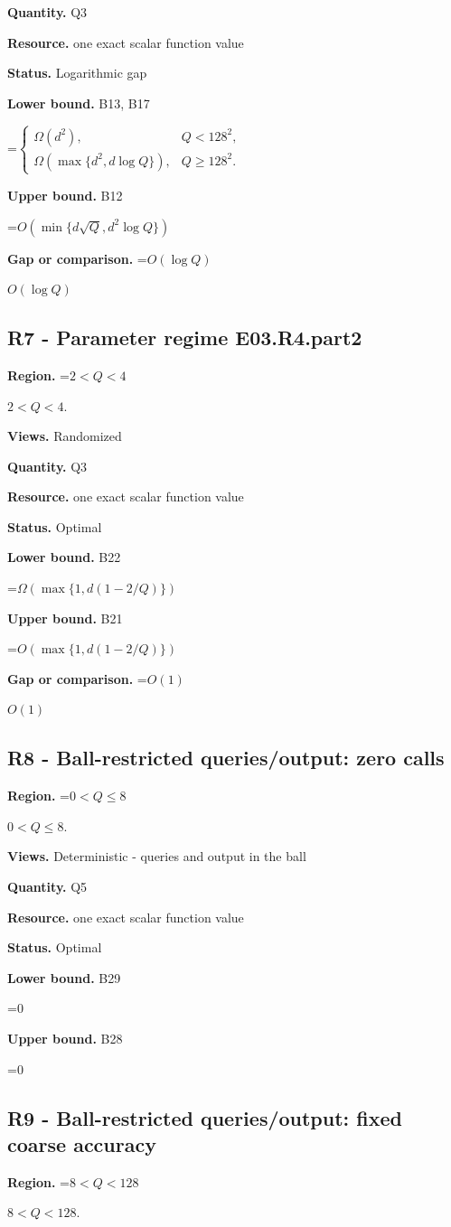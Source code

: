 \documentclass[10pt,a4paper]{article}
\newcommand{\AtlasMath}[1]{\par\begingroup\centering\setbox0=\hbox{$\displaystyle #1$}\ifdim\wd0>1.4\linewidth\typeout{ATLAS WIDE FORMULA: \the\wd0}\fi\ifdim\wd0>\linewidth\resizebox{\linewidth}{!}{\box0}\else\box0\fi\par\endgroup}
\newcommand{\AtlasInlineMath}[1]{\begingroup\setbox0=\hbox{$#1$}\ifdim\wd0>.4\linewidth\endgroup\AtlasMath{#1}\else\endgroup$#1$\fi}
\begin{document}
\textbf{Quantity.} Q3

\textbf{Resource.} one exact scalar function value

\textbf{Status.} Logarithmic gap

\textbf{Lower bound.} B13, B17

\AtlasMath{\begin{cases}\Omega(d^2),&Q<128^2,\\\Omega(\max\{d^2,d\log Q\}),&Q\ge128^2.\end{cases}}
\textbf{Upper bound.} B12

\AtlasMath{O(\min\{d\sqrt Q,d^2\log Q\})}
\textbf{Gap or comparison.} \AtlasInlineMath{O(\log Q)}

\subsection{R7 - Parameter regime E03.R4.part2}
\textbf{Region.} \AtlasInlineMath{2<Q<4}.

\textbf{Views.} Randomized

\textbf{Quantity.} Q3

\textbf{Resource.} one exact scalar function value

\textbf{Status.} Optimal

\textbf{Lower bound.} B22

\AtlasMath{\Omega(\max\{1,d(1-2/Q)\})}
\textbf{Upper bound.} B21

\AtlasMath{O(\max\{1,d(1-2/Q)\})}
\textbf{Gap or comparison.} \AtlasInlineMath{O(1)}

\subsection{R8 - Ball-restricted queries/output: zero calls}
\textbf{Region.} \AtlasInlineMath{0<Q\le8}.

\textbf{Views.} Deterministic - queries and output in the ball

\textbf{Quantity.} Q5

\textbf{Resource.} one exact scalar function value

\textbf{Status.} Optimal

\textbf{Lower bound.} B29

\AtlasMath{0}
\textbf{Upper bound.} B28

\AtlasMath{0}
\subsection{R9 - Ball-restricted queries/output: fixed coarse accuracy}
\textbf{Region.} \AtlasInlineMath{8<Q<128}.
\end{document}
